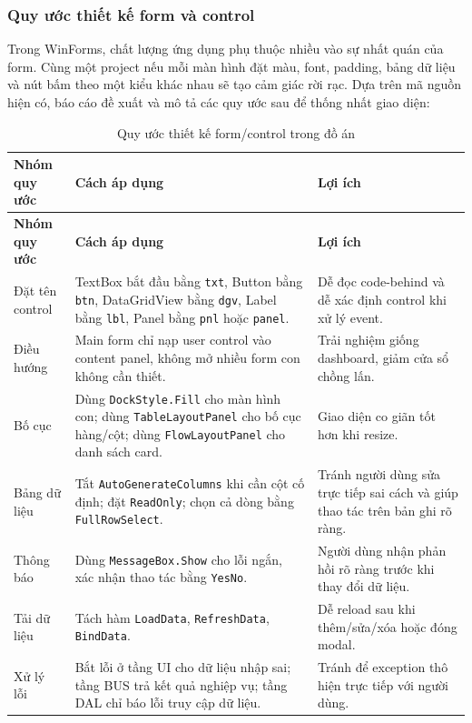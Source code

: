 \documentclass[12pt,a4paper]{article}
\numberwithin{figure}{subsection}
\numberwithin{table}{subsection}
\begin{document}
\subsubsection{Quy ước thiết kế form và control}

Trong WinForms, chất lượng ứng dụng phụ thuộc nhiều vào sự nhất quán của form. Cùng một project nếu mỗi màn hình đặt màu, font, padding, bảng dữ liệu và nút bấm theo một kiểu khác nhau sẽ tạo cảm giác rời rạc. Dựa trên mã nguồn hiện có, báo cáo đề xuất và mô tả các quy ước sau để thống nhất giao diện:

\begin{longtable}{|p{3.6cm}|p{5.2cm}|p{5cm}|}
\caption{Quy ước thiết kế form/control trong đồ án} \\
\hline
\textbf{Nhóm quy ước} & \textbf{Cách áp dụng} & \textbf{Lợi ích} \\
\hline
\endfirsthead
\hline
\textbf{Nhóm quy ước} & \textbf{Cách áp dụng} & \textbf{Lợi ích} \\
\hline
\endhead
Đặt tên control & TextBox bắt đầu bằng \texttt{txt}, Button bằng \texttt{btn}, DataGridView bằng \texttt{dgv}, Label bằng \texttt{lbl}, Panel bằng \texttt{pnl} hoặc \texttt{panel}. & Dễ đọc code-behind và dễ xác định control khi xử lý event. \\
\hline
Điều hướng & Main form chỉ nạp user control vào content panel, không mở nhiều form con không cần thiết. & Trải nghiệm giống dashboard, giảm cửa sổ chồng lấn. \\
\hline
Bố cục & Dùng \texttt{DockStyle.Fill} cho màn hình con; dùng \texttt{TableLayoutPanel} cho bố cục hàng/cột; dùng \texttt{FlowLayoutPanel} cho danh sách card. & Giao diện co giãn tốt hơn khi resize. \\
\hline
Bảng dữ liệu & Tắt \texttt{AutoGenerateColumns} khi cần cột cố định; đặt \texttt{ReadOnly}; chọn cả dòng bằng \texttt{FullRowSelect}. & Tránh người dùng sửa trực tiếp sai cách và giúp thao tác trên bản ghi rõ ràng. \\
\hline
Thông báo & Dùng \texttt{MessageBox.Show} cho lỗi ngắn, xác nhận thao tác bằng \texttt{YesNo}. & Người dùng nhận phản hồi rõ ràng trước khi thay đổi dữ liệu. \\
\hline
Tải dữ liệu & Tách hàm \texttt{LoadData}, \texttt{RefreshData}, \texttt{BindData}. & Dễ reload sau khi thêm/sửa/xóa hoặc đóng modal. \\
\hline
Xử lý lỗi & Bắt lỗi ở tầng UI cho dữ liệu nhập sai; tầng BUS trả kết quả nghiệp vụ; tầng DAL chỉ báo lỗi truy cập dữ liệu. & Tránh để exception thô hiện trực tiếp với người dùng. \\
\hline
\end{longtable}
\end{document}
